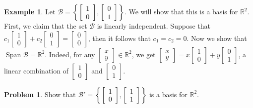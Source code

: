 \documentclass[12pt,letterpaper]{book}
\numberwithin{equation}{section}
\theoremstyle{definition}
\newtheorem{problem}[thm]{\textbf{Problem}}
\newtheorem{example}[thm]{\textbf{Example}}
\newcommand{\Span}{\operatorname{Span}}
\begin{document}
\begin{example}\label{stdbasisr2} Let $\mathscr{B}=\left\{\left[\begin{array}{r} 1 \\
0 \end{array}\right],\left[\begin{array}{r} 0 \\ 1
\end{array}\right]\right\}$. We will show that this is a basis for $\mathbb{R}^2$.
First, we claim that the set $\mathscr{B}$ is linearly independent. Suppose that $c_1\left[\begin{array}{r} 1 \\
0 \end{array}\right]+c_2\left[\begin{array}{r} 0 \\
1 \end{array}\right]=\left[\begin{array}{r} 0 \\
0 \end{array}\right]$, then it follows that $c_1=c_2=0$. Now we show that $\Span\mathscr{B}=\mathbb{R}^2$. Indeed, for any $\left[\begin{array}{r} x \\
y \end{array}\right]\in \mathbb{R}^2$, we get $\left[\begin{array}{r} x \\
y \end{array}\right]=x\left[\begin{array}{r} 1 \\
0 \end{array}\right]+y\left[\begin{array}{r} 0 \\
1 \end{array}\right]$, a linear combination of $\left[\begin{array}{r} 1 \\
0 \end{array}\right]$ and $\left[\begin{array}{r} 0 \\
1 \end{array}\right]$.
\end{example}

\begin{problem}\label{anotherbasis}
Show that $\mathscr{B}'=\left\{\left[\begin{array}{r} 1 \\
0 \end{array}\right],\left[\begin{array}{r} 1 \\ 1
\end{array}\right]\right\}$ is a basis for $\mathbb{R}^2$.
\end{problem}
\end{document}
